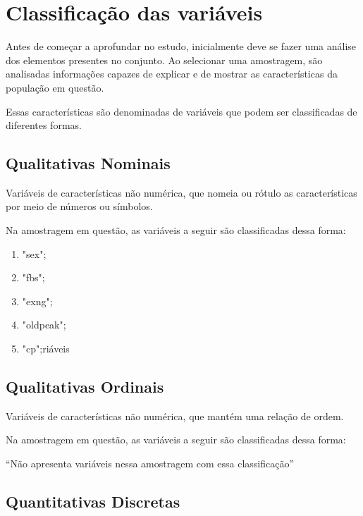 \chapter{Classificação das variáveis}

    \setcounter{section}{0}

    Antes de começar a aprofundar no estudo, inicialmente deve se fazer uma análise dos elementos 
    presentes no conjunto. Ao selecionar uma amostragem, são analisadas informações capazes de explicar 
    e de mostrar as características da população em questão.

    Essas características são denominadas de variáveis que podem ser classificadas de diferentes formas.

    \section{Qualitativas Nominais}

    Variáveis de características não numérica, que nomeia ou rótulo as características por meio de números ou símbolos. 
    
    Na amostragem em questão, as variáveis a seguir são classificadas dessa forma: 

    \begin{enumerate}[label={\alph*)}]
        \addtolength{\itemindent}{1.25cm}
        \item "sex";
        \item "fbs";
        \item "exng";
        \item "oldpeak";
        \item "cp";riáveis
    \end{enumerate}

    \section{Qualitativas Ordinais}

    Variáveis de características não numérica, que mantém uma relação de ordem. 
  
    Na amostragem em questão, as variáveis a seguir são classificadas dessa forma: 

    
    “Não apresenta variáveis nessa amostragem com essa classificação”


    \section{Quantitativas Discretas}

